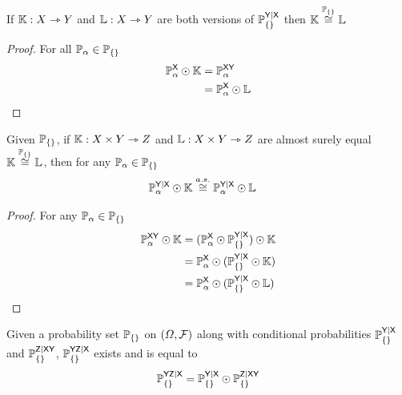 \begin{lemma}
If $\mathbb{K}:X\rightarrowtriangle Y$ and $\mathbb{L}:X\rightarrowtriangle Y$ are both versions of $\mathbb{P}_{\{\}}^{\mathsf{Y}|\mathsf{X}}$ then $\mathbb{K}\overset{\mathbb{P}_{\{\}}}{\cong}\mathbb{L}$
\end{lemma}

\begin{proof}
For all $\mathbb{P}_\alpha \in \mathbb{P}_{\{\}}$
\begin{align}
	\mathbb{P}^{\mathsf{X}}_\alpha\odot \mathbb{K} &= \mathbb{P}^{\mathsf{XY}}_\alpha\\
	&= \mathbb{P}^{\mathsf{X}}_\alpha\odot \mathbb{L}
\end{align}
\end{proof}

\begin{lemma}
Given $\mathbb{P}_{\{\}}$, if $\mathbb{K}:X\times Y \rightarrowtriangle Z$ and $\mathbb{L}:X\times Y \rightarrowtriangle Z$ are almost surely equal $\mathbb{K}\overset{\mathbb{P}_{\{\}}}{\cong}\mathbb{L}$, then for any $\mathbb{P}_\alpha\in \mathbb{P}_{\{\}}$
\begin{align}
	\mathbb{P}_\alpha^{\mathsf{Y}|\mathsf{X}}\odot \mathbb{K} &\overset{a.s.}{\cong} \mathbb{P}_\alpha^{\mathsf{Y}|\mathsf{X}}\odot \mathbb{L}
\end{align}
\end{lemma}

\begin{proof}
For any $\mathbb{P}_\alpha\in\mathbb{P}_{\{\}}$
\begin{align}
	\mathbb{P}_\alpha^{\mathsf{XY}}\odot \mathbb{K} &= (\mathbb{P}_\alpha^{\mathsf{X}}\odot \mathbb{P}_{\{\}}^{\mathsf{Y}|\mathsf{X}})\odot \mathbb{K}\\
											  &= \mathbb{P}_\alpha^{\mathsf{X}}\odot (\mathbb{P}_{\{\}}^{\mathsf{Y}|\mathsf{X}}\odot \mathbb{K})\\
											  &= \mathbb{P}_\alpha^{\mathsf{X}}\odot (\mathbb{P}_{\{\}}^{\mathsf{Y}|\mathsf{X}}\odot \mathbb{L})
\end{align}
\end{proof}

\begin{lemma}\label{lem:joint_conditional}
Given a probability set $\mathbb{P}_{\{\}}$ on $(\Omega,\mathcal{F})$ along with conditional probabilities $\mathbb{P}_{\{\}}^{\mathsf{Y}|\mathsf{X}}$ and $\mathbb{P}_{\{\}}^{\mathsf{Z}|\mathsf{XY}}$, $\mathbb{P}_{\{\}}^{\mathsf{YZ}|\mathsf{X}}$ exists and is equal to
\begin{align}
	\mathbb{P}_{\{\}}^{\mathsf{YZ}|\mathsf{X}} &= \mathbb{P}_{\{\}}^{\mathsf{Y}|\mathsf{X}}\odot \mathbb{P}_{\{\}}^{\mathsf{Z}|\mathsf{XY}}\\
\end{align}
\end{lemma}

